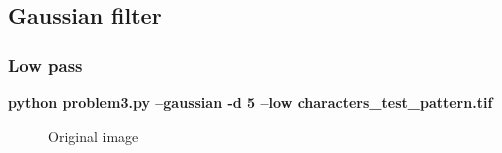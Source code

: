     \pagebreak
    \subsection{Gaussian filter}

        \subsubsection{Low pass}

        \small{\textbf{python problem3.py --gaussian -d 5 --low characters\_test\_pattern.tif}}

        \begin{figure}[!htb]\centering
            \begin{minipage}{0.45\textwidth}
                \caption{Original image}
            \end{minipage}
            \begin{minipage}{0.45\textwidth}

\end{minipage}
\end{figure}
